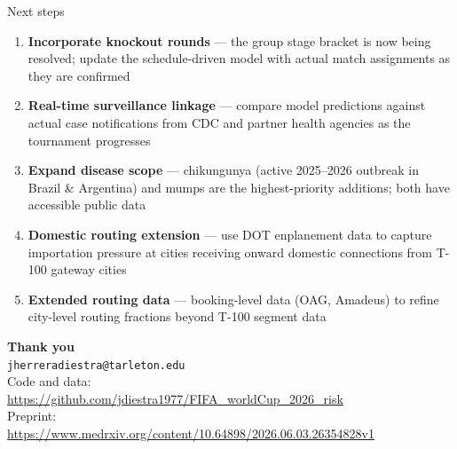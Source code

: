 \documentclass[aspectratio=169, 11pt]{beamer}
\begin{document}
\begin{frame}{Next steps}
  \begin{enumerate}
    \item \textbf{Incorporate knockout rounds} — the group stage
          bracket is now being resolved; update the schedule-driven
          model with actual match assignments as they are confirmed

    \item \textbf{Real-time surveillance linkage} — compare model
          predictions against actual case notifications from CDC
          and partner health agencies as the tournament progresses

    \item \textbf{Expand disease scope} — chikungunya (active
          2025--2026 outbreak in Brazil \& Argentina) and mumps are
          the highest-priority additions; both have accessible
          public data

    \item \textbf{Domestic routing extension} — use DOT enplanement
          data to capture importation pressure at cities receiving
          onward domestic connections from T-100 gateway cities

    \item \textbf{Extended routing data} — booking-level data
          (OAG, Amadeus) to refine city-level routing fractions
          beyond T-100 segment data
  \end{enumerate}
\end{frame}

\begin{frame}[plain]
  \vfill
  \begin{center}
    {\Large\textbf{Thank you}}\\[1em]
    \texttt{jherreradiestra@tarleton.edu}\\[0.8em]
    {\small Code and data:}\\[0.2em]
    {\small\url{https://github.com/jdiestra1977/FIFA_worldCup_2026_risk}}\\[0.6em]
    {\small Preprint:}\\[0.2em]
    {\small\url{https://www.medrxiv.org/content/10.64898/2026.06.03.26354828v1}}
  \end{center}
  \vfill
\end{frame}

\end{document}
